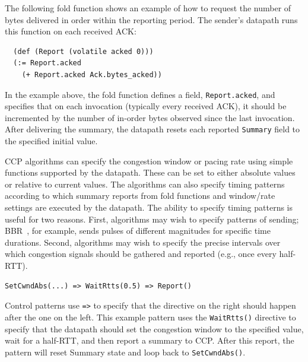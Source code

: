 The following fold function shows an example of how to request the number of bytes delivered in order within the reporting period. The sender's datapath runs this function on each received ACK:

{\footnotesize
\begin{verbatim}
  (def (Report (volatile acked 0)))
  (:= Report.acked
    (+ Report.acked Ack.bytes_acked))
\end{verbatim}
 }
 
In the example above, the fold function defines a field, \texttt{Report.acked}, and specifies that on each invocation (typically every received ACK), it should be incremented by the number of in-order bytes observed since the last invocation. After delivering the summary, the datapath resets each reported \texttt{Summary} field to the specified initial value.

 
 CCP algorithms can specify the congestion window or pacing rate using simple functions supported by the datapath. These can be set to either absolute values or relative to current values. The algorithms can also specify timing patterns according to which summary reports from fold functions and window/rate settings are executed by the datapath. 
The ability to specify timing patterns is useful for two reasons. First, algorithms may wish to specify patterns of sending; BBR~\cite{bbr}, for example, sends pulses of different magnitudes for specific time durations. Second, algorithms may wish to specify the precise intervals over which congestion signals should be gathered and reported (e.g., once every half-RTT).
 
\begin{verbatim}
SetCwndAbs(...) => WaitRtts(0.5) => Report()
\end{verbatim}
 
Control patterns use \texttt{=>} to specify that the directive on the right should happen after the one on the left. This example pattern uses the \texttt{WaitRtts()} directive to specify that the datapath should set the congestion window to the specified value, wait for a half-RTT, and then report a summary to CCP. After this report, the pattern will reset Summary state and loop back to \texttt{SetCwndAbs()}.
 
